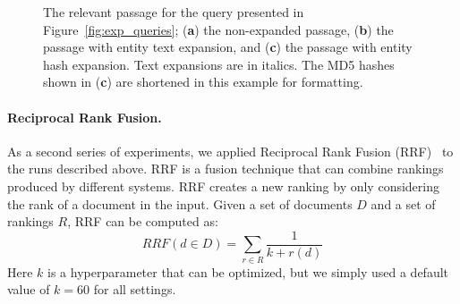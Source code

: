 \begin{figure}
	\caption{The relevant passage for the query presented in Figure~\ref{fig:exp_queries}; (\textbf{a}) the non-expanded passage, (\textbf{b}) the passage with entity text expansion, and (\textbf{c}) the passage with entity hash expansion. Text expansions are in italics. The MD5 hashes shown in (\textbf{c}) are shortened in this example for formatting.}
	\label{fig:exp_passage}
\end{figure}


\paragraph{Reciprocal Rank Fusion.} As a second series of experiments, we applied Reciprocal Rank Fusion (RRF)~\citep{10.1145/1571941.1572114} to the runs described above. RRF is a fusion technique that can combine rankings produced by different systems. RRF creates a new ranking by only considering the rank of a document in the input. Given a set of documents $D$ and a set of rankings $R$, RRF can be computed as: 
\begin{equation}
	\mathit{RRF}(d \in D) = \sum_{r\in R}\frac{1}{k + r(d)}
\end{equation}
Here $k$ is a hyperparameter that can be optimized, but we simply used a default value of $k=60$ for all settings.

